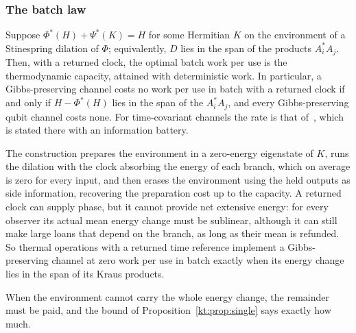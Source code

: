 \subsubsection{The batch law}

\begin{theorem}\label{kt:thm:balanced}
Suppose $\Phi^*(H)+\Psi^*(K)=H$ for some Hermitian $K$ on the environment of a Stinespring dilation of $\Phi$; equivalently, $D$ lies in the span of the products $A_i^*A_j$. Then, with a returned clock, the optimal batch work per use is the thermodynamic capacity, attained with deterministic work. In particular, a Gibbs-preserving channel costs no work per use in batch with a returned clock if and only if $H-\Phi^*(H)$ lies in the span of the $A_i^*A_j$, and every Gibbs-preserving qubit channel costs none. For time-covariant channels the rate is that of~\cite[Thm.~7.1]{FBB21}, which is stated there with an information battery.
\end{theorem}

The construction prepares the environment in a zero-energy eigenstate of $K$, runs the dilation with the clock absorbing the energy of each branch, which on average is zero for every input, and then erases the environment using the held outputs as side information, recovering the preparation cost up to the capacity. A returned clock can supply phase, but it cannot provide net extensive energy: for every observer its actual mean energy change must be sublinear, although it can still make large loans that depend on the branch, as long as their mean is refunded. So thermal operations with a returned time reference implement a Gibbs-preserving channel at zero work per use in batch exactly when its energy change lies in the span of its Kraus products.

When the environment cannot carry the whole energy change, the remainder must be paid, and the bound of Proposition~\ref{kt:prop:single} says exactly how much.

